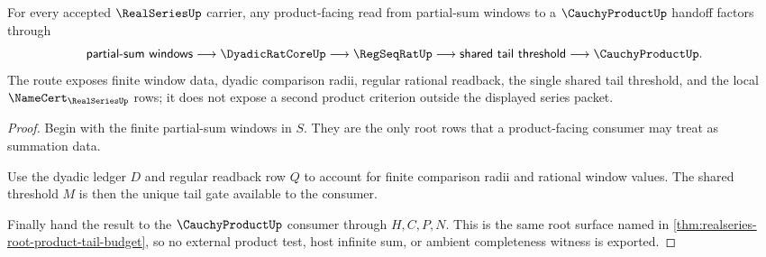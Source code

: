 \begin{theorem}\label{thm:realseries-partial-sum-product-route}
For every accepted $\RealSeriesUp$ carrier, any product-facing read from partial-sum windows to a $\CauchyProductUp$ handoff factors through
$$
\mathsf{partial\mbox{-}sum\ windows}
\longrightarrow \DyadicRatCoreUp
\longrightarrow \RegSeqRatUp
\longrightarrow \mathsf{shared\ tail\ threshold}
\longrightarrow \CauchyProductUp .
$$
The route exposes finite window data, dyadic comparison radii, regular rational readback, the single shared tail threshold, and the local $\NameCert_{\RealSeriesUp}$ rows; it does not expose a second product criterion outside the displayed series packet.
\end{theorem}
\begin{proof}
Begin with the finite partial-sum windows in $S$. They are the only root rows that a product-facing consumer may treat as summation data.

Use the dyadic ledger $D$ and regular readback row $Q$ to account for finite comparison radii and rational window values. The shared threshold $M$ is then the unique tail gate available to the consumer.

Finally hand the result to the $\CauchyProductUp$ consumer through $H,C,P,N$. This is the same root surface named in \autoref{thm:realseries-root-product-tail-budget}, so no external product test, host infinite sum, or ambient completeness witness is exported.
\end{proof}
